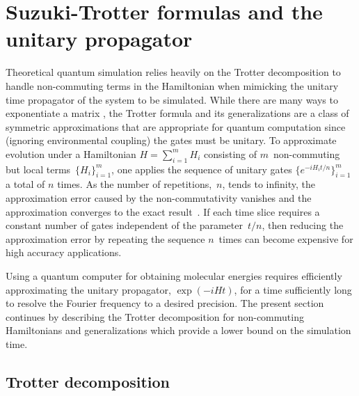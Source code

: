 \documentclass[11pt,oneside,final]{huthesis}%
\begin{document}
\section{Suzuki-Trotter formulas and the unitary propagator}
\label{sec:UP}
Theoretical quantum simulation 
relies
heavily on the Trotter decomposition to handle
non-commuting terms in the Hamiltonian when mimicking
the unitary time propagator of the system to be simulated. While there are many ways to exponentiate a matrix \cite{Moler03}, the Trotter formula and its generalizations are a class of symmetric approximations that are appropriate for quantum computation since (ignoring environmental coupling) the gates must be unitary.
To approximate evolution under a Hamiltonian $H = \sum_{i=1}^m H_i$
consisting of $m$~non-commuting but local terms~$\{H_i\}_{i=1}^m$,
one applies the sequence of unitary gates
$\{e^{-iH_it/n}\}_{i=1}^m$ a total of $n$ times.
As the number of repetitions,~$n$, 
tends to infinity, the approximation error caused by the non-commutativity
vanishes and the approximation converges to the exact
result~\cite{Lloyd96}. If each time slice requires a constant number of
gates independent of the
parameter~$t/n$, then reducing the approximation error by repeating the sequence
$n$~times can become expensive for high accuracy applications.


Using a quantum computer for obtaining  
molecular energies requires efficiently approximating the unitary propagator, 
$\exp(-iHt)$, for a time sufficiently long to resolve the Fourier frequency to a desired 
precision.  The present section continues by describing the Trotter decomposition 
for non-commuting Hamiltonians and generalizations which provide a lower bound on the simulation time. 

\subsection{Trotter decomposition}\label{sec:Trot}
\end{document}
